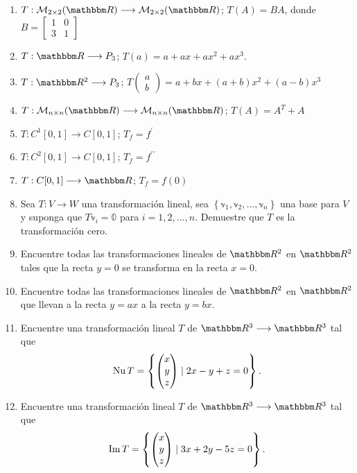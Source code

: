\begin{enumerate}[start=53]
    \item $T: \mathcal{M}_{2 \times 2}(\RR) \longrightarrow \mathcal{M}_{2 \times 2}(\RR)$; $T(A)=B A$, donde $B=\begin{bmatrix}1 & 0 \\ 3 & 1\end{bmatrix}$
    \item $T: \RR \longrightarrow P_3$; $T(a)=a+a x+a x^2+a x^3$.
    \item $T: \RR[2] \longrightarrow P_3$; $T\begin{pmatrix}a \\ b\end{pmatrix}=a+b x+(a+b) x^2+(a-b) x^3$
    \item $T: \mathcal{M}_{n \times n}(\RR) \longrightarrow \mathcal{M}_{n \times n}(\RR)$; $T(A)=A^{T}+A$
    \item $T: C^1[0,1] \longrightarrow C[0,1]$; $T_f=f^{\prime}$
    \item $T: C^2[0,1] \longrightarrow C[0,1]$; $T_f=f^{\prime \prime}$
    \item $T: C[0,1] \longrightarrow \RR$; $T_f=f(0)$
    \item Sea $T: V \longrightarrow W$ una transformación lineal, sea $\left\{\mathbb{v}_1, \mathbb{v}_2, \dots, \mathbb{v}_n\right\}$ una base para $V$ y suponga que $T \mathbb{v}_i=\mathbb{0}$ para $i=1,2, \dots, n$. Demuestre que $T$ es la transformación cero.
    \item Encuentre todas las transformaciones lineales de $\RR[2]$ en $\RR[2]$ tales que la recta $y=0$ se transforma en la recta $x=0$.
    \item Encuentre todas las transformaciones lineales de $\RR[2]$ en $\RR[2]$ que llevan a la recta $y=a x$ a la recta $y=b x$.
    \item Encuentre una transformación lineal $T$ de $\RR[3] \longrightarrow \RR[3]$ tal que
    $$\operatorname{Nu} T=\left\{ \begin{pmatrix} x \\ y \\ z \end{pmatrix} \mid 2 x-y+z=0\right\} .$$
    \item Encuentre una transformación lineal $T$ de $\RR[3] \longrightarrow \RR[3]$ tal que
    $$\operatorname{Im} T=\left\{\begin{pmatrix} x \\ y \\ z \end{pmatrix} \mid 3 x+2 y-5 z=0\right\} .$$
\end{enumerate}
